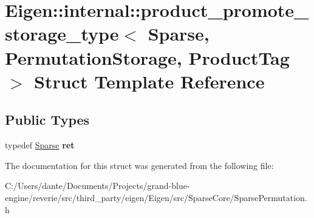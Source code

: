 \hypertarget{struct_eigen_1_1internal_1_1product__promote__storage__type_3_01_sparse_00_01_permutation_storage_00_01_product_tag_01_4}{}\section{Eigen\+::internal\+::product\+\_\+promote\+\_\+storage\+\_\+type$<$ Sparse, Permutation\+Storage, Product\+Tag $>$ Struct Template Reference}
\label{struct_eigen_1_1internal_1_1product__promote__storage__type_3_01_sparse_00_01_permutation_storage_00_01_product_tag_01_4}
\subsection*{Public Types}
\begin{DoxyCompactItemize}
\item 
\mbox{\label{struct_eigen_1_1internal_1_1product__promote__storage__type_3_01_sparse_00_01_permutation_storage_00_01_product_tag_01_4_ace01e399db4afadd5edfdbc639de80c7}} 
typedef \mbox{\hyperlink{struct_eigen_1_1_sparse}{Sparse}} {\bfseries ret}
\end{DoxyCompactItemize}


The documentation for this struct was generated from the following file\+:\begin{DoxyCompactItemize}
\item 
C\+:/\+Users/dante/\+Documents/\+Projects/grand-\/blue-\/engine/reverie/src/third\+\_\+party/eigen/\+Eigen/src/\+Sparse\+Core/Sparse\+Permutation.\+h\end{DoxyCompactItemize}
